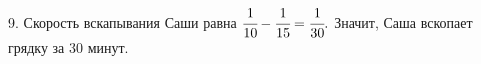 9. Скорость вскапывания Саши равна $\cfrac{1}{10}-\cfrac{1}{15}=\cfrac{1}{30}.$ Значит, Саша вскопает грядку за 30 минут.\\
